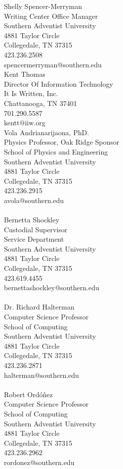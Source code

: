  
Shelly Spencer-Merryman\\
Writing Center Office Manager\\
Southern Adventist University\\
4881 Taylor Circle\\
Collegedale, TN 37315\\
423.236.2508\\
spencermerryman@southern.edu\\

Kent Thomas\\
Director Of Information Technology\\
It Is Written, Inc.\\
Chattanooga, TN 37401\\
701.290.5587\\
kentt@iiw.org\\

Vola Andrianarijaona, PhD.\\
Physics Professor, Oak Ridge Sponsor\\
School of Physics and Engineering\\
Southern Adventist University\\
4881 Taylor Circle\\
Collegedale, TN 37315\\
423.236.2915\\
avola@southern.edu\\
\\
Bernetta Shockley\\
Custodial Supervisor\\
Service Department\\
Southern Adventist University\\
4881 Taylor Circle\\
Collegedale, TN 37315\\
423.619.4455\\
bernettashockley@southern.edu\\
\\
Dr. Richard Halterman\\
Computer Science Professor\\
School of Computing\\
Southern Adventist University\\
4881 Taylor Circle\\
Collegedale, TN 37315\\
423.236.2871\\
halterman@southern.edu\\
\\
Robert Ordóñez\\
Computer Science Professor\\
School of Computing\\
Southern Adventist University\\
4881 Taylor Circle\\
Collegedale, TN 37315\\
423.236.2962\\
rordonez@southern.edu\\
